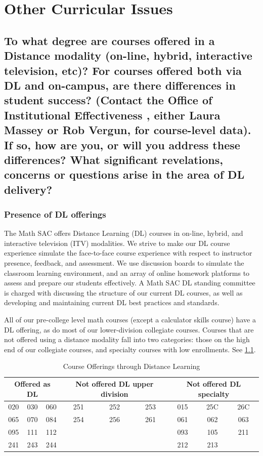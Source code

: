 \chapter{Other  Curricular Issues}
\section[Distance education]{To what degree are courses offered in a Distance
modality (on-line, hybrid, interactive television, etc)? For courses offered
both via DL and on-campus, are there differences in student success? (Contact
the Office of Institutional Effectiveness , either Laura Massey or Rob Vergun,
for course-level data). If so, how are you, or will you address these
differences? What significant revelations, concerns or questions arise in the
area of DL delivery?}

\subsection{Presence of DL offerings}
The Math SAC offers Distance Learning (DL) courses in on-line, hybrid, and
interactive television (ITV) modalities.  We strive to make our DL course
experience simulate the face-to-face course experience with respect to
instructor presence, feedback, and assessment. We use discussion boards to
simulate the classroom learning environment, and an array of online homework
platforms to assess and prepare our students effectively. A Math SAC DL standing
committee is charged with discussing the structure of our current DL courses, as
well as developing and maintaining current DL best practices and standards.

All of our pre-college level math courses (except a calculator skills course)
have a DL offering, as do most of our lower-division collegiate courses.
Courses that are not offered using a distance modality fall into two categories:
those on the high end of our collegiate courses, and specialty courses with low
enrollments. See \cref{tab:sec3:DLofferings}.

\begin{table}
\caption{Course Offerings through Distance Learning}\label{tab:sec3:DLofferings}
\centering
\begin{tabular}{ccccccccc}
\toprule
\multicolumn{3}{p{1in}}{Offered as DL} & \multicolumn{3}{p{1in}}{Not offered  DL upper division} & \multicolumn{3}{p{1in}}{Not offered  DL specialty}\\
\midrule
020& 030& 060& 		251& 252& 253&		015& 25C& 26C\\
065& 070& 084& 		254& 256& 261&		061& 062& 063\\
095& 111& 112& 		&&&					093& 105& 211\\
241& 243& 244&		&&&					212& 213\\

\bottomrule
\end{tabular}
\end{table}

